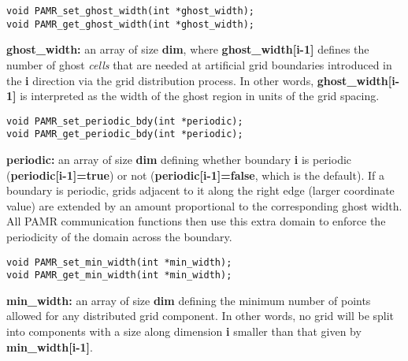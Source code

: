 \documentclass[aps,amssymb,unsortedaddress,nofootinbib]{revtex4}
\def\lsep{\itemsep 0.05in}
\begin{document}

\begin{verbatim}
void PAMR_set_ghost_width(int *ghost_width);
void PAMR_get_ghost_width(int *ghost_width);
\end{verbatim}
\begin{list}{}{\lsep}
\item {\bf *ghost\_width:} an array of size {\bf dim}, where {\bf ghost\_width[i-1]} defines the 
                      number of ghost {\em cells} that are needed at artificial grid boundaries 
                      introduced in the {\bf i} direction via the grid distribution
                      process.  In other words, {\bf ghost\_width[i-1]} is interpreted as 
		      the width of the ghost
		      region in units of the grid spacing.
\end{list}


\begin{verbatim}
void PAMR_set_periodic_bdy(int *periodic);
void PAMR_get_periodic_bdy(int *periodic);
\end{verbatim}
\begin{list}{}{\lsep}
\item {\bf *periodic:} an array of size {\bf dim} defining whether boundary {\bf i} is periodic 
                       ({\bf periodic[i-1]=true}) or not ({\bf periodic[i-1]=false}, which is the default). If a boundary
                       is periodic, grids adjacent to it along the right edge (larger coordinate value) 
                       are extended by an amount proportional to the corresponding ghost width. All PAMR 
                       communication functions then use this extra domain to enforce the periodicity
                       of the domain across the boundary.
\end{list}


\begin{verbatim}
void PAMR_set_min_width(int *min_width);
void PAMR_get_min_width(int *min_width);
\end{verbatim}
\begin{list}{}{\lsep}
\item {\bf *min\_width:} an array of size {\bf dim} defining the minimum number of points allowed for any
                      distributed grid component. In other words, no grid will be split into 
                      components with a size along dimension {\bf i} smaller than that given
                      by {\bf min\_width[i-1]}.
\end{list}
\end{document}

